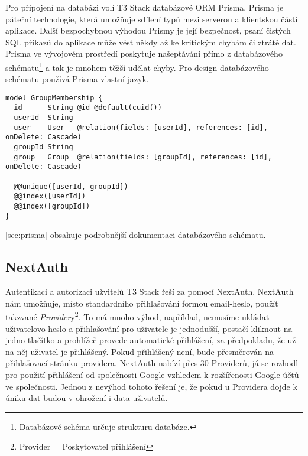 Pro připojení na databázi volí T3 Stack databázové ORM Prisma. Prisma je páteřní technologie, která umožňuje sdílení typů mezi serverou a klientskou částí aplikace. Další bezpochybnou výhodou Prismy je její bezpečnost, psaní čistých SQL příkazů do aplikace může vést někdy až ke kritickým chybám či ztrátě dat. Prisma ve vývojovém prostředí poskytuje našeptávání přímo z databázového schématu\footnote{Databázové schéma určuje strukturu databáze.} a tak je mnohem těžší udělat chyby.
Pro design databázového schématu používá Prisma vlastní jazyk.

\begin{lstlisting}[language=Prisma, caption={Úryvek z Databázové schématu zobrazující strukturu tabulky pro členství ve skupině}]
model GroupMembership {
  id      String @id @default(cuid())
  userId  String
  user    User   @relation(fields: [userId], references: [id], onDelete: Cascade)
  groupId String
  group   Group  @relation(fields: [groupId], references: [id], onDelete: Cascade)

  @@unique([userId, groupId])
  @@index([userId])
  @@index([groupId])
}
\end{lstlisting}

\autoref{sec:prisma} obsahuje podrobnější dokumentaci databázového schématu.

\subsection{NextAuth}
Autentikaci a autorizaci užvitelů T3 Stack řeší za pomocí NextAuth. NextAuth nám umožňuje, místo standardního přihlašování formou email-heslo, použít takzvané \textit{Provider}y\footnote{Provider = Poskytovatel přihlášení}.
To má mnoho výhod, například, nemusíme ukládat uživatelovo heslo a přihlašování pro uživatele je jednodušší, postačí kliknout na jedno tlačítko a prohlížeč provede automatické přihlášení, za předpokladu, že už na něj uživatel je přihlášený.
Pokud přihlášený není, bude přesměrován na přihlašovací stránku providera. NextAuth nabízí přes 30 Providerů\cite{next-auth}, já se rozhodl pro použití přihlášení od společnosti Google vzhledem k rozšířenosti Google účtů ve společnosti. Jednou z nevýhod tohoto řešení je, že pokud u Providera dojde k úniku dat budou v ohrožení i data uživatelů.

